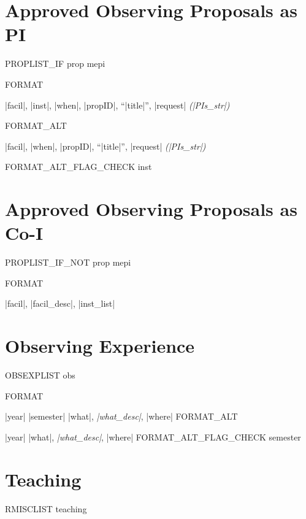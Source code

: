 \documentclass[line,10pt]{article}
\def\sectionfont{\fontsize{11pt}{0pt}\bf}
\newlength{\mainindent} \setlength{\mainindent}{15pt}
\newlength{\mainnegindent} \setlength{\mainnegindent}{-20pt}
\newlength{\mainextraindent} \setlength{\mainextraindent}{35pt}
\newlength{\contentindent} \setlength{\contentindent}{17ex}
\newlength{\entrywidth} \setlength{\entrywidth}{\dimexpr\textwidth-\mainextraindent\relax}
\let\origsection\section
\renewcommand\section{\starsection}
\newcommand\starsection[1]
{\sectionprelude\origsection*{\sectionfont#1}\sectionpostlude}
\newcommand\sectionprelude{%
  \vspace{\sectionskip}
}
\newcommand\sectionpostlude{%
  \vspace{\sectionafterskip}
}
\newenvironment{datelist}{
  \begingroup
  \raggedright
  \begin{description}[labelindent=\mainindent,leftmargin=\contentindent,
      style=sameline,font=\normalfont,topsep=0pt,partopsep=1pt, 
      parsep=0pt,
      itemsep=0pt]
}{
  \end{description}
  \endgroup
}
\begin{document}
\section{Approved Observing Proposals as PI}

\begin{itemize}[label={},itemindent=\mainnegindent,leftmargin=\mainextraindent,partopsep=1pt]
PROPLIST_IF prop mepi
\end{itemize}



FORMAT \parbox{\entrywidth}{\item |facil|, |inst|, |when|, |propID|, ``|title|'', |request| \emph{(|PIs_str|)}}\vskip 3.5pt
FORMAT_ALT \parbox{\entrywidth}{\item |facil|, |when|, |propID|, ``|title|'', |request| \emph{(|PIs_str|)}}\vskip 3.5pt
FORMAT_ALT_FLAG_CHECK inst
\section{Approved Observing Proposals as Co-I}

\vskip 2pt
\begin{itemize}[label={},itemindent=\mainnegindent,leftmargin=\mainextraindent,partopsep=1pt]
PROPLIST_IF_NOT prop mepi
\end{itemize}


FORMAT \item |facil|, |facil_desc|, |inst_list|
\section{Observing Experience}
\begin{itemize}[label={},leftmargin=\mainindent,partopsep=1pt]
OBSEXPLIST obs
\end{itemize}




FORMAT \item[|year| |semester|] |what|, \emph{|what_desc|}, |where|
FORMAT_ALT \item[|year|] |what|, \emph{|what_desc|}, |where|
FORMAT_ALT_FLAG_CHECK semester

\section{Teaching}
\begin{datelist}
RMISCLIST teaching
\end{datelist}
\end{document}
